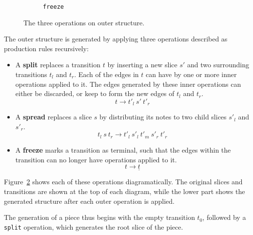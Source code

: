 \documentclass[12pt,a4paper,twoside,openright]{report}
\theoremstyle{definition}
\begin{document}
\begin{figure}
\begin{subfigure}[t]{.24\textwidth}
    \caption{\texttt{freeze}}
    \label{fig:freezeOp}
  \end{subfigure}
  \centering
  \captionsetup{width=.9\linewidth}
  \caption{The three operations on outer structure. }
  \label{fig:outerOperations}
\end{figure}

The outer structure is generated by applying three operations described as production rules recursively:

\begin{itemize}
  \item A \textbf{split} replaces a transition $t$ by inserting a new slice $s'$ and two surrounding transitions $t_l$ and $t_r$. Each of the edges in $t$ can have by one or more inner operations applied to it. The edges generated by these inner operations can either be discarded, or keep to form the new edges of $t_l$ and $t_r$.
\begin{equation}
  t \to t'_l~s'~t'_r
  \label{eq:splitrule}
\end{equation}
  \item A \textbf{spread} replaces a slice $s$ by distributing its notes to two child slices $s'_l$ and $s'_r$. 
\begin{equation}
  t_l~s~t_r \to t'_l~s'_l~t'_m~s'_r~t'_r
  \label{eq:spreadrule}
\end{equation}
\item A \textbf{freeze} marks a transition as terminal, such that the edges within the transition can no longer have operations applied to it. 
\begin{equation}
  t \to \underline{t}
  \label{eq:freezerule}
\end{equation}
\end{itemize}

Figure~\ref{fig:outerOperations} shows each of these operations diagramatically. The original slices and transitions are shown at the top of each diagram, while the lower part shows the generated structure after each outer operation is applied.

The generation of a piece thus begins with the empty transition $t_0$, followed by a \texttt{split} operation, which generates the root slice of the piece. 
\end{document}
